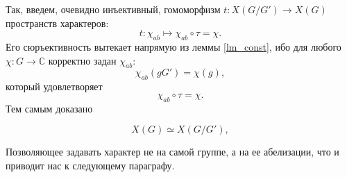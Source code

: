     Так, введем, очевидно инъективный, гомоморфизм 
    $t: X(G/G') \to X(G)$ пространств характеров:
    \begin{equation}
        t : \chi_{ab} \mapsto \chi_{ab} \circ \tau = \chi. 
    \end{equation}
    Его сюръективность вытекает напрямую из леммы \ref{lm_const}, ибо для 
    любого $\chi : G \to \mathbb{C}$ корректно задан $\chi_{ab}$:
    \[\chi_{ab}(gG') = \chi(g),\]
    который удовлетворяет 
    \[\chi_{ab} \circ \tau = \chi.\]
    Тем самым доказано
    \begin{statement}
        \[X(G) \simeq X(G/G'),\]
    \end{statement}
    Позволяющее задавать характер не на самой группе, а на ее 
    абелизации, что и приводит нас к следующему параграфу.
    